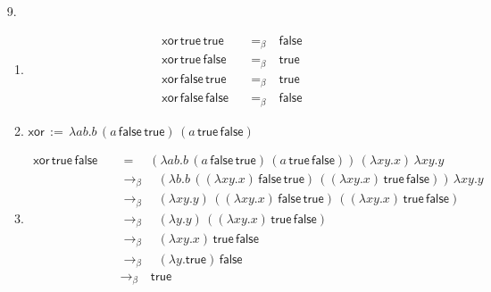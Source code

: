\documentclass[a4paper,11pt]{article}
\begin{document}
\begin{enumerate}


\item[9.]

\begin{enumerate}

\item
\begin{align*}
  \textsf{xor} \, \textsf{true} \, \textsf{true} \quad & =_{\beta} \quad \textsf{false}\\
  \textsf{xor} \, \textsf{true} \, \textsf{false} \quad & =_{\beta} \quad \textsf{true}\\
  \textsf{xor} \, \textsf{false} \, \textsf{true} \quad & =_{\beta} \quad \textsf{true}\\
  \textsf{xor} \, \textsf{false} \, \textsf{false} \quad & =_{\beta} \quad \textsf{false}
\end{align*}

\item
$\textsf{xor} \, := \, \lambda a b. b \, (a \, \textsf{false} \, \textsf{true}) \, (a \, \textsf{true} \, \textsf{false})$

\item
\begin{align*}
  \textsf{xor} \, \textsf{true} \, \textsf{false}
  & \quad = \quad
  (\lambda a b. b \, (a \, \textsf{false} \, \textsf{true}) \, (a \, \textsf{true} \, \textsf{false})) \, (\lambda x y. x) \, \lambda x y. y\\
  & \quad \rightarrow_{\beta} \quad
  (\lambda b. b \, ((\lambda x y. x) \, \textsf{false} \, \textsf{true}) \, ((\lambda x y. x) \, \textsf{true} \, \textsf{false})) \, \lambda x y. y\\
  & \quad \rightarrow_{\beta} \quad
  (\lambda x y. y) \, ((\lambda x y. x) \, \textsf{false} \, \textsf{true}) \, ((\lambda x y. x) \, \textsf{true} \, \textsf{false})\\
  & \quad \rightarrow_{\beta} \quad
  (\lambda y. y) \, ((\lambda x y. x) \, \textsf{true} \, \textsf{false})\\
  & \quad \rightarrow_{\beta} \quad
  (\lambda x y. x) \, \textsf{true} \, \textsf{false}\\
  & \quad \rightarrow_{\beta} \quad
  (\lambda y. \textsf{true}) \, \textsf{false}\\
  & \quad \rightarrow_{\beta} \quad
  \textsf{true}
\end{align*}

\end{enumerate}


\end{enumerate}
\end{document}
